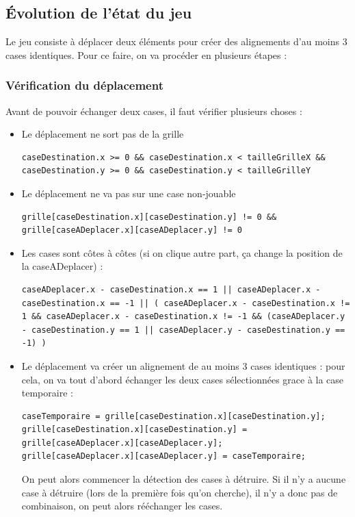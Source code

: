 \subsection{Évolution de l'état du jeu}

Le jeu consiste à déplacer deux éléments pour créer des alignements d'au moins 3 cases identiques. Pour ce faire, on va procéder en plusieurs étapes :

\subsubsection{Vérification du déplacement}
Avant de pouvoir échanger deux cases, il faut vérifier plusieurs choses :
\begin{itemize}
	\item
		Le déplacement ne sort pas de la grille
\begin{lstlisting}
caseDestination.x >= 0 && caseDestination.x < tailleGrilleX && caseDestination.y >= 0 && caseDestination.y < tailleGrilleY
\end{lstlisting}
	\item
		Le déplacement ne va pas sur une case non-jouable
\begin{lstlisting}
grille[caseDestination.x][caseDestination.y] != 0 && grille[caseADeplacer.x][caseADeplacer.y] != 0
\end{lstlisting}
	\item
		Les cases sont côtes à côtes (si on clique autre part, ça change la position de la caseADeplacer) :
\begin{lstlisting}
caseADeplacer.x - caseDestination.x == 1 || caseADeplacer.x - caseDestination.x == -1 || ( caseADeplacer.x - caseDestination.x != 1 && caseADeplacer.x - caseDestination.x != -1 && (caseADeplacer.y - caseDestination.y == 1 || caseADeplacer.y - caseDestination.y == -1) )
\end{lstlisting}
	\item
		Le déplacement va créer un alignement de au moins 3 cases identiques : pour cela, on va tout d'abord échanger les deux cases sélectionnées grace à la case temporaire :
\begin{lstlisting}
caseTemporaire = grille[caseDestination.x][caseDestination.y];
grille[caseDestination.x][caseDestination.y] = grille[caseADeplacer.x][caseADeplacer.y];
grille[caseADeplacer.x][caseADeplacer.y] = caseTemporaire;
\end{lstlisting}
		On peut alors commencer la détection des cases à détruire. Si il n'y a aucune case à détruire (lors de la première fois qu'on cherche), il n'y a donc pas de combinaison, on peut alors rééchanger les cases.
\end{itemize}


